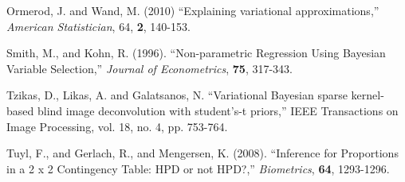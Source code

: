 \documentclass[12pt,epsf]{article}
\begin{document}
\begin{description}
\item
Ormerod, J. and Wand, M. (2010) ``Explaining variational approximations,'' {\em American Statistician}, 64, {\bf 2}, 140-153.

\item
Smith, M., and Kohn, R. (1996). ``Non-parametric Regression Using Bayesian Variable Selection,'' {\em Journal of Econometrics},
{\bf 75}, 317-343.

\item
Tzikas, D., Likas, A.  and Galatsanos, N. ``Variational Bayesian sparse kernel-based blind image deconvolution with student's-t priors,'' IEEE Transactions on Image Processing, vol. 18, no. 4, pp. 753-764.

\item Tuyl, F., and Gerlach, R., and Mengersen, K. (2008). ``Inference for Proportions in a 2 x 2 Contingency Table: HPD or not HPD?,''
{\em Biometrics}, {\bf 64}, 1293-1296.



\end{description}


\end{document}
